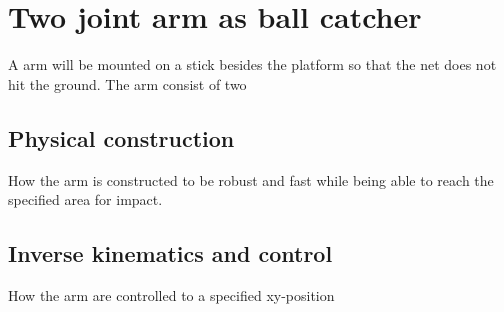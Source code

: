 \chapter{Two joint arm as ball catcher}
\label{catcherArm}
A arm will be mounted on a stick besides the platform so that the net does not hit the ground. The arm consist of two

\section{Physical construction}
\label{armConstruction}
How the arm is constructed to be robust and fast while being able to reach the specified area for impact.


\section{Inverse kinematics and control }
\label{kinematics}
How the arm are controlled to a specified xy-position
